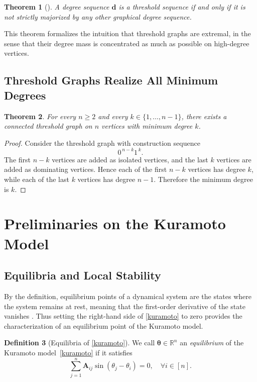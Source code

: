 \documentclass[11pt,reqno]{amsart}
\newtheorem{theorem}{Theorem}[section]
\theoremstyle{definition}
\newtheorem{definition}[theorem]{Definition}
\begin{document}
\begin{theorem}[\cite{peled1989polytope}]\label{major}
A degree sequence $\mathbf d$ is a threshold sequence if and only if it is not strictly majorized by any other graphical degree sequence.
\end{theorem}
This theorem formalizes the intuition that threshold graphs are extremal, in the sense that their degree mass is concentrated as much as possible on high-degree vertices.

\subsection{Threshold Graphs Realize All Minimum Degrees}
\begin{theorem}
For every \(n\ge 2\) and every \(k\in\{1,\ldots,n-1\}\), there exists a
connected threshold graph on \(n\) vertices with minimum degree \(k\).
\end{theorem}

\begin{proof}
Consider the threshold graph with construction sequence
\[
0^{\,n-k}1^{\,k}.
\]
The first \(n-k\) vertices are added as isolated vertices, and the last \(k\)
vertices are added as dominating vertices. Hence each of the first \(n-k\)
vertices has degree \(k\), while each of the last \(k\) vertices has degree
\(n-1\). Therefore the minimum degree is \(k\).
\end{proof}
\section{Preliminaries on the Kuramoto Model}
\label{pre-kura}

\subsection{Equilibria and Local Stability}
By the definition, equilibrium points of a dynamical system are the states where the system remains at rest, meaning that the first-order derivative of the state vanishes \cite{khalil2002nonlinear}.
Thus setting the right-hand side of \eqref{kuramoto} to zero provides the characterization of an equilibrium point of the Kuramoto model.

\begin{definition}[Equilibria of \eqref{kuramoto}]\label{equili}
We call $\boldsymbol\theta \in \mathbb{R}^n$ an \emph{equilibrium} of the Kuramoto model~\eqref{kuramoto} 
if it satisfies
\begin{equation}\label{gradient-vanish}
    \sum_{j=1}^n \boldsymbol{A}_{ij}\sin(\theta_j-\theta_i)=0,
    \quad \forall i\in[n].
\end{equation}
\end{definition}
\end{document}
